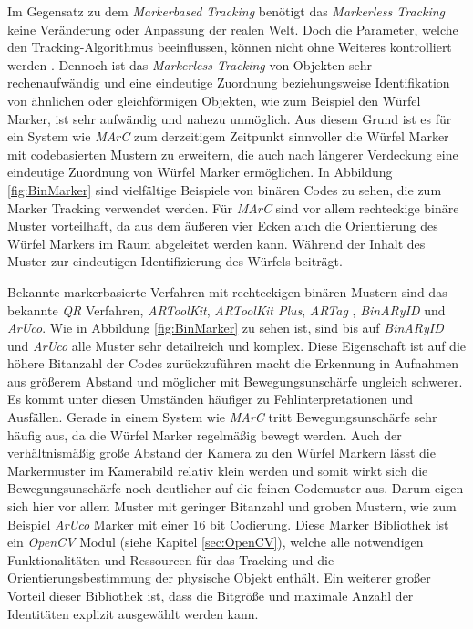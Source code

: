 Im Gegensatz zu dem \textit{Markerbased Tracking} benötigt das \textit{Markerless Tracking} keine Veränderung oder Anpassung der realen Welt. Doch die Parameter, welche den Tracking-Algorithmus beeinflussen, können nicht ohne Weiteres kontrolliert werden \cite{article:MarkerLessBarandiaran2010}. Dennoch ist das \textit{Markerless Tracking} von Objekten sehr rechenaufwändig und eine eindeutige Zuordnung beziehungsweise Identifikation von ähnlichen oder gleichförmigen Objekten, wie zum Beispiel den Würfel Marker, ist sehr aufwändig und nahezu unmöglich. Aus diesem Grund ist es für ein System wie \textit{MArC} zum derzeitigem Zeitpunkt sinnvoller die Würfel Marker mit codebasierten Mustern zu erweitern, die auch nach längerer Verdeckung eine eindeutige Zuordnung von Würfel Marker ermöglichen. In Abbildung \ref{fig:BinMarker} sind vielfältige Beispiele von binären Codes zu sehen, die zum Marker Tracking verwendet werden. Für \textit{MArC} sind vor allem rechteckige binäre Muster vorteilhaft, da aus dem äußeren vier Ecken auch die Orientierung des Würfel Markers im Raum abgeleitet werden kann. Während der Inhalt des Muster zur eindeutigen Identifizierung des Würfels beiträgt. 

Bekannte markerbasierte Verfahren mit rechteckigen binären Mustern sind das bekannte \textit{QR} Verfahren, \textit{ARToolKit}\cite{article:MarkerARTOOL}, \textit{ARToolKit Plus}\cite{article:MarkerARTOOL2}, \textit{ARTag} \cite{article:MarkerARTag}, \textit{BinARyID}\cite{article:MarkerBinAR} und \textit{ArUco}\cite{article:Aruco2014}. Wie in Abbildung \ref{fig:BinMarker} zu sehen ist, sind bis auf \textit{BinARyID} und \textit{ArUco} alle Muster sehr detailreich und komplex. Diese Eigenschaft ist auf die höhere Bitanzahl der Codes zurückzuführen macht die Erkennung in Aufnahmen aus größerem Abstand und möglicher mit Bewegungsunschärfe ungleich schwerer. Es kommt unter diesen Umständen häufiger zu Fehlinterpretationen und Ausfällen. Gerade in einem System wie \textit{MArC} tritt Bewegungsunschärfe sehr häufig aus, da die Würfel Marker regelmäßig bewegt werden. Auch der verhältnismäßig große Abstand der Kamera zu den Würfel Markern lässt die Markermuster im Kamerabild relativ klein werden und somit wirkt sich die Bewegungsunschärfe noch deutlicher auf die feinen Codemuster aus. Darum eigen sich hier vor allem Muster mit geringer Bitanzahl und groben Mustern, wie zum Beispiel \textit{ArUco} Marker mit einer $16$ bit Codierung. Diese Marker Bibliothek ist ein \textit{OpenCV} Modul (siehe Kapitel \ref{sec:OpenCV}), welche alle notwendigen Funktionalitäten und Ressourcen für das Tracking und die Orientierungsbestimmung der physische Objekt enthält. Ein weiterer großer Vorteil dieser Bibliothek ist, dass die Bitgröße und maximale Anzahl der Identitäten explizit ausgewählt werden kann.


